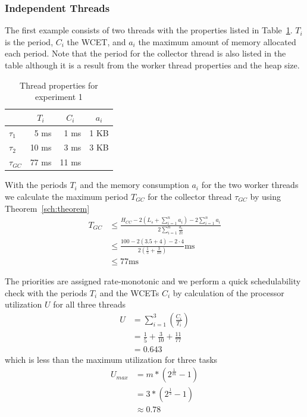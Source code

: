 \subsubsection{Independent Threads}

The first example consists of two threads with the properties listed
in Table~\ref{fig:ex1}. $T_i$ is the period, $C_i$ the WCET, and
$a_i$ the maximum amount of memory allocated each period. Note that
the period for the collector thread is also listed in the table
although it is a result from the worker thread properties and the
heap size.

\begin{table}[tb]
\begin{center}
\begin{tabular}{lrrr}
    \toprule
    & \multicolumn{1}{c}{$T_i$} & \multicolumn{1}{c}{$C_i$} & \multicolumn{1}{c}{$a_i$} \\
    \midrule
    $\tau_1$ & 5 ms & 1 ms & 1 KB \\
    $\tau_2$ & 10 ms & 3 ms & 3 KB \\
    $\tau_{GC}$ & 77 ms & 11 ms & \\
    \bottomrule
\end{tabular}
    \caption{Thread properties for experiment 1}
\label{fig:ex1}
\end{center}
\end{table}

With the periods $T_i$ and the memory consumption $a_i$ for the two
worker threads we calculate the maximum period $T_{GC}$ for the
collector thread $\tau_{GC}$ by using Theorem~\ref{sch:theorem}
\begin{align*}
    T_{GC} & \le \frac{H_{CC}-2\left(L_s+\sum_{i=1}^{n} a_i\right)-2\sum_{i=1}^{n} a_i}
        {2\sum_{i=1}^{n} \frac{a_i}{Ti}} \\
           & \le \frac{100-2(3.5+4)-2\cdot4}
           {2\left(\frac{1}{5}+\frac{3}{10}\right)}\mbox{ms}\\
           & \le 77\mbox{ms}
\end{align*}

The priorities are assigned rate-monotonic \cite{321743} and we
perform a quick schedulability check with the periods $T_i$ and the
WCETs $C_i$ by calculation of the processor utilization $U$ for all
three threads
\begin{align*}
    U & = \sum_{i=1}^{3}\left(\frac{C_i}{T_i}\right)\\
      & = \frac{1}{5} + \frac{3}{10} + \frac{11}{77}\\
      & = 0.643
\end{align*}
which is less than the maximum utilization for three tasks
\begin{align*}
    U_{max} & = m*(2^{\frac{1}{m}}-1)\\
      & = 3*(2^{\frac{1}{3}}-1)\\
      & \approx 0.78
\end{align*}

